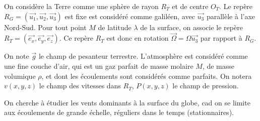 \documentclass{report}
\begin{document}
On considère la Terre comme une sphère de rayon $R_T$ et de centre $O_T$. Le repère $R_G=(\vec{u_1},\vec{u_2},\vec{u_3})$ est fixe est considéré comme galiléen, avec $\vec{u_3}$ parallèle à l'axe Nord-Sud. Pour tout point $M$ de latitude $\lambda$ de la surface, on associe le repère $R_T=(\vec{e_x},\vec{e_y},\vec{e_z})$. Ce repère $R_T$ est donc en rotation $\vec{\Omega}=\Omega\vec{u_3}$ par rapport à $R_G$.


On note $\vec{g}$ le champ de pesanteur terrestre. L'atmosphère est considéré comme une fine couche d'air, qui est un gaz parfait de masse molaire $M$, de masse volumique $\rho$, et dont les écoulements sont considérés comme parfaits. On notera $v(x,y,z)$ le champ des vitesses dans $R_T$, $P(x,y,z)$ le champ de pression.

On cherche à étudier les vents dominants à la surface du globe, cad on se limite aux écoulements de grande échelle, réguliers dans le temps (stationnaires). 
\end{document}
